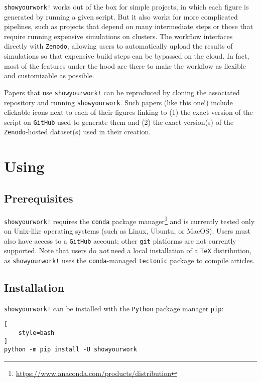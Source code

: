 \documentclass[modern]{aastex631}
\begin{document}
\texttt{showyourwork!} works out of the box for simple projects, in which each figure is generated by running a given script. 
But it also works for more complicated pipelines, such as projects that depend on many intermediate steps or those that require running expensive simulations on clusters. 
The workflow interfaces directly with \texttt{Zenodo}, allowing users to automatically upload the results of simulations so that expensive build steps can be bypassed on the cloud. 
In fact, most of the features under the hood are there to make the workflow as flexible and customizable as possible.

Papers that use \texttt{showyourwork!} can be reproduced by cloning the associated repository and running \texttt{showyourwork}. 
Such papers (like this one!) include clickable icons next to each of their figures linking to (1) the exact version of the script on \texttt{GitHub} used to generate them and (2) the exact version(s) of the \texttt{Zenodo}-hosted dataset(s) used in their creation.

\section{Using \showyourwork}
\label{sec:usage}

\subsection{Prerequisites}
\label{sec:usage:prereq}
\texttt{showyourwork!} requires the \texttt{conda} package manager\footnote{\url{https://www.anaconda.com/products/distribution}} and is currently tested only on Unix-like operating systems (such as Linux, Ubuntu, or MacOS).
Users must also have access to a \texttt{GitHub} account; other \texttt{git} platforms are not currently supported.
Note that users do \emph{not} need a local installation of a \texttt{TeX} distribution, as \texttt{showyourwork!} uses the \texttt{conda}-managed \texttt{tectonic} package to compile articles.

\subsection{Installation}
\label{sec:usage:install}
\texttt{showyourwork!} can be installed with the \texttt{Python} package manager \texttt{pip}:\\

\noindent\begin{minipage}{\linewidth}
\begin{lstlisting}[
    style=bash
]
python -m pip install -U showyourwork
\end{lstlisting}
\end{minipage}
\end{document}
